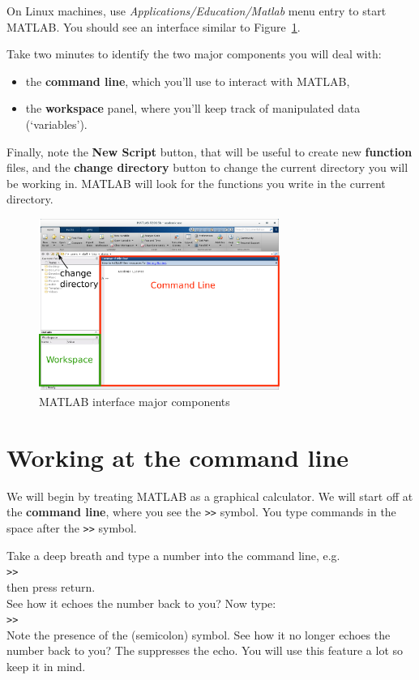 \documentclass{article}
\begin{document}
On Linux machines, use \emph{Applications/Education/Matlab} menu entry to start MATLAB.
You should see an interface similar to Figure~\ref{fig:interface}.

Take two minutes to identify the two major components you will deal with:
\begin{itemize}
\item the \textbf{command line}, which you'll use to interact with MATLAB,
\item the \textbf{workspace} panel, where you'll keep track of manipulated data (`variables').
\end{itemize}

Finally, note the \textbf{New Script} button, that will be useful to create new \textbf{function} files,
and the \textbf{change directory} button to change the current directory you will be working in. MATLAB will 
look for the functions you write in the current directory.

\begin{figure}[h]
  \centering
  \includegraphics[width=0.7\textwidth]{interface.pdf}
  \caption{MATLAB interface major components}\label{fig:interface}
\end{figure}

\pagebreak
\section{Working at the command line}

We will begin by treating MATLAB as a graphical calculator.
We will start off at the \textbf{command line}, where you see the \verb|>>| symbol.
You type commands in the space after the \verb|>>| symbol.

Take a deep breath and type a number into the command line, e.g. \\
\verb|>>|  \\
then press return. \\
See how it echoes the number back to you? Now type: \\
\verb|>>|  \\
Note the presence of the \mcode{;} (semicolon) symbol.
See how it no longer echoes the number back to you?
The \mcode{;} suppresses the echo.
You will use this feature a lot so keep it in mind.
\end{document}
